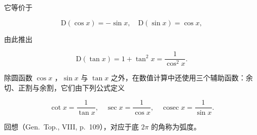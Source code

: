 它等价于

\[
\mathrm{D} (\cos x) = - \sin x, \quad \mathrm{D} (\sin x) = \cos x,
\]

由此推出

\[
\mathrm{D} (\tan x) = 1 + \tan^ {2} x = \frac {1}{\cos^ {2} x}.\tag{15}
\]

除圆函数 \(\cos x\) ，\(\sin x\) 与 \(\tan x\) 之外，在数值计算中还使用三个辅助函数：余切、正割与余割，它们由下列公式定义

\[
\cot x = \frac {1}{\tan x}, \quad \sec x = \frac {1}{\cos x}, \quad \operatorname{cosec} x = \frac {1}{\sin x}.
\]

回想（Gen.~Top., VIII, p.~109），对应于底 \(2\pi\) 的角称为弧度。

